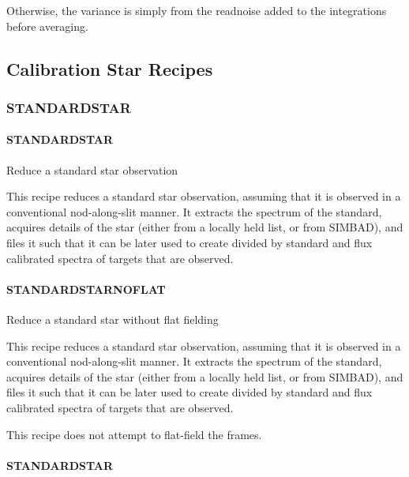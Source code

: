 \documentclass[twoside,11pt]{article}
\renewcommand{\_}{\texttt{\symbol{95}}}
\begin{document}
Otherwise, the variance is simply from the readnoise added to the integrations
before averaging.



\subsection{Calibration Star Recipes}

\subsubsection{STANDARD\_STAR}
\paragraph{STANDARD\_STAR\label{STANDARD_STAR}}

Reduce a standard star observation


\mbox{}

This recipe reduces a standard star observation, assuming that it is
observed in a conventional nod-along-slit manner. It extracts the
spectrum of the standard, acquires details of the star (either from a
locally held list, or from SIMBAD), and files it such that it can be
later used to create divided by standard and flux calibrated spectra
of targets that are observed.

\paragraph{STANDARD\_STAR\_NOFLAT\label{STANDARD_STAR_NOFLAT}}

Reduce a standard star without flat fielding


\mbox{}

This recipe reduces a standard star observation, assuming that it is
observed in a conventional nod-along-slit manner. It extracts the
spectrum of the standard, acquires details of the star (either from a
locally held list, or from SIMBAD), and files it such that it can be
later used to create divided by standard and flux calibrated spectra
of targets that are observed.



This recipe does not attempt to flat-field the frames.

\paragraph{\_STANDARD\_STAR\_\label{_STANDARD_STAR_}}
\end{document}
